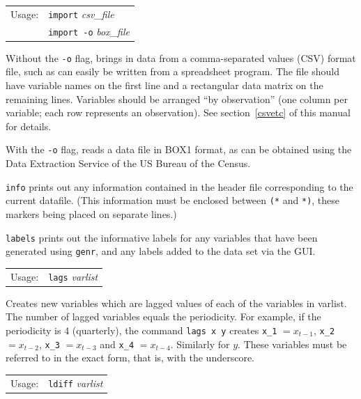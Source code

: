 \documentclass{article}
\begin{document}
{

\begin{tabular}{ll}
Usage:  &       \texttt{import} \textit{csv\_file}\\
        &       \texttt{import -o} \textit{box\_file}
\end{tabular} 

Without the \texttt{-o} flag, brings in data from a comma-separated
values (CSV) format file, such as can easily be written from a
spreadsheet program.  The file should have variable names on the first
line and a rectangular data matrix on the remaining lines.  Variables
should be arranged ``by observation'' (one column per variable; each
row represents an observation).  See section~\ref{csvetc} of this
manual for details.

With the \texttt{-o} flag, reads a data file in BOX1 format, as can be
obtained using the Data Extraction Service of the US Bureau of the
Census.


\texttt{info} prints out any information contained in the
header file corresponding to the current datafile.
(This information must be enclosed between \verb+(*+ and \verb+*)+,
these markers being placed on separate lines.)


\texttt{labels} prints out the informative labels for any variables
that have been generated using \texttt{genr}, and any labels added to
the data set via the GUI.


\begin{tabular}{ll}
Usage:  & \texttt{lags} \textit{varlist} 
\end{tabular}

Creates new variables which are lagged values of each of the variables
in varlist.  The number of lagged variables equals the periodicity.
For example, if the periodicity is 4 (quarterly), the command
\texttt{lags x y} creates \verb+x_1+ $= x_{t-1}$, \verb+x_2+ $=
x_{t-2}$, \verb+x_3+ $= x_{t-3}$ and \verb+x_4+ $= x_{t-4}$.  Similarly
for $y$.  These variables must be referred to in the exact form, that
is, with the underscore.


\begin{tabular}{ll}
Usage:   &      \texttt{ldiff} \textit{varlist} 
\end{tabular}

}
\end{document}
